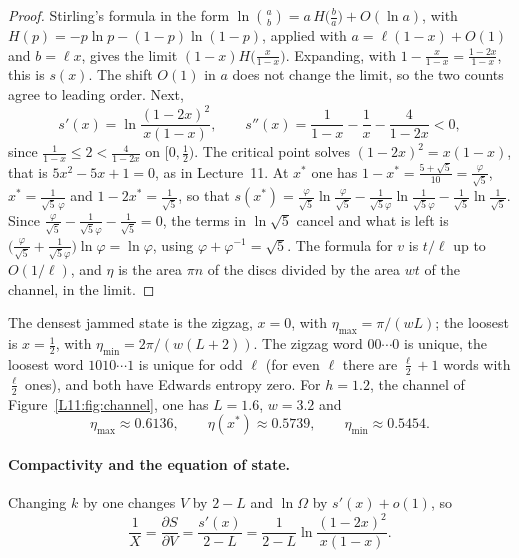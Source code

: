 \documentclass[11pt,openany]{book}
\theoremstyle{plain}
\theoremstyle{definition}
\theoremstyle{remark}
\begin{document}
\begin{proof}
Stirling's formula in the form $\ln\binom ab=a\,H\!\big(\tfrac ba\big)+O(\ln a)$, with
$H(p)=-p\ln p-(1-p)\ln(1-p)$, applied with $a=\ell(1-x)+O(1)$ and $b=\ell x$, gives the limit
$(1-x)H\big(\frac x{1-x}\big)$. Expanding, with $1-\frac x{1-x}=\frac{1-2x}{1-x}$, this is $s(x)$. The
shift $O(1)$ in $a$ does not change the limit, so the two counts agree to leading order. Next,
\[
  s'(x)=\ln\frac{(1-2x)^2}{x(1-x)},\qquad s''(x)=\frac1{1-x}-\frac1x-\frac4{1-2x}<0,
\]
since $\frac1{1-x}\le2<\frac4{1-2x}$ on $[0,\frac12)$. The critical point solves $(1-2x)^2=x(1-x)$, that is
$5x^2-5x+1=0$, as in Lecture~11. At $x^*$ one has $1-x^*=\frac{5+\sqrt5}{10}=\frac{\varphi}{\sqrt5}$,
$x^*=\frac{1}{\sqrt5\,\varphi}$ and $1-2x^*=\frac{1}{\sqrt5}$, so that
$s(x^*)=\frac\varphi{\sqrt5}\ln\frac\varphi{\sqrt5}-\frac1{\sqrt5\varphi}\ln\frac1{\sqrt5\varphi}-\frac1{\sqrt5}\ln\frac1{\sqrt5}$.
Since $\frac\varphi{\sqrt5}-\frac1{\sqrt5\varphi}-\frac1{\sqrt5}=0$, the terms in $\ln\sqrt5$ cancel and what is
left is $\big(\frac\varphi{\sqrt5}+\frac1{\sqrt5\varphi}\big)\ln\varphi=\ln\varphi$, using
$\varphi+\varphi^{-1}=\sqrt5$. The formula for $v$ is $t/\ell$ up to $O(1/\ell)$, and $\eta$ is the area
$\pi n$ of the discs divided by the area $wt$ of the channel, in the limit.
\end{proof}

The densest jammed state is the zigzag, $x=0$, with $\eta_{\max}=\pi/(wL)$; the loosest is
$x=\frac12$, with $\eta_{\min}=2\pi/(w(L+2))$. The zigzag word $00\cdots0$ is unique, the loosest word
$1010\cdots1$ is unique for odd $\ell$ (for even $\ell$ there are $\frac\ell2+1$ words with $\frac\ell2$
ones), and both have Edwards entropy zero. For $h=1.2$, the channel of Figure~\ref{L11:fig:channel}, one has $L=1.6$, $w=3.2$ and
\[
  \eta_{\max}\approx0.6136,\qquad \eta(x^*)\approx0.5739,\qquad \eta_{\min}\approx0.5454 .
\]

\paragraph{Compactivity and the equation of state.} Changing $k$ by one changes $V$ by $2-L$ and $\ln\Omega$
by $s'(x)+o(1)$, so
\begin{equation}\label{SM:eq:compactivity}
  \frac1X=\frac{\partial S}{\partial V}=\frac{s'(x)}{2-L}=\frac1{2-L}\ln\frac{(1-2x)^2}{x(1-x)} .
\end{equation}
\end{document}
